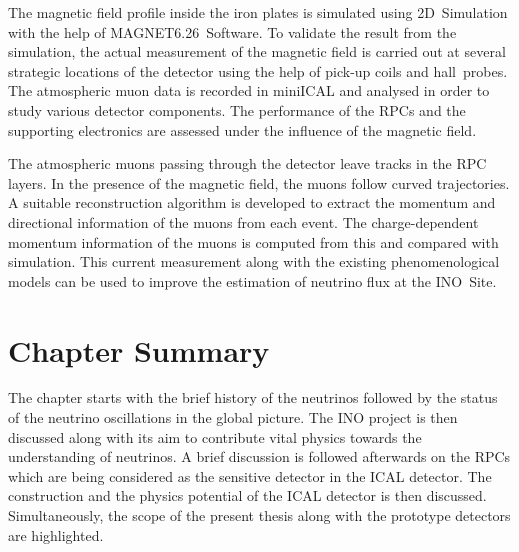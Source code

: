 The magnetic field profile inside the iron plates is simulated using
2D~Simulation with the help of MAGNET6.26~Software\cite{magnet}.
To validate the result from the simulation, the actual
measurement of the magnetic field is carried out at several strategic
locations of the detector using the help of pick-up coils and
hall~probes. The atmospheric muon data is recorded in miniICAL and
analysed in order to study various detector components. The
performance of the RPCs and the supporting electronics are assessed
under the influence of the magnetic field.

The atmospheric muons passing through the detector leave tracks in the
RPC layers. In the presence of the magnetic field, the muons follow
curved trajectories. A suitable reconstruction algorithm is
developed to extract the momentum and directional information of the
muons from each event. The charge-dependent momentum information of
the muons is computed from this and compared with simulation. This
current measurement along with the existing phenomenological models
can be used
to improve the estimation of neutrino flux at the INO~Site.

\section{Chapter Summary}
The chapter starts with the brief history of the neutrinos followed
by the status of the neutrino oscillations in the global picture. The
INO project is then discussed along with its aim to contribute vital
physics towards the understanding of neutrinos. A brief discussion is
followed afterwards on the RPCs which are being considered as the
sensitive detector in the ICAL detector. The construction and the physics
potential of the ICAL detector is then discussed. Simultaneously, the
scope of the present thesis along with the prototype detectors are
highlighted.
